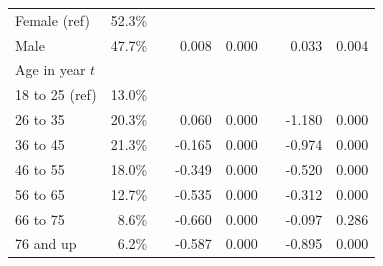 \begin{table}[H]
\begin{tabular}{lrrrrrrr}
		\hspace{2mm} Female (ref)                              & 52.3\%  &  &                          &                       &                      &                          &                       \\
		\hspace{2mm} Male                                      & 47.7\%  &  & 0.008                    & 0.000                 &                      & 0.033                    & 0.004                 \\
		Age in year $t$                             &         &  &                          &                       &                      &                          &                       \\
		\hspace{2mm} 18 to 25 (ref)                            & 13.0\%  &  &                          &                       &                      &                          &                       \\
		\hspace{2mm} 26 to 35                                  & 20.3\%  &  & 0.060                    & 0.000                 &                      & -1.180                   & 0.000                 \\
		\hspace{2mm} 36 to 45                                  & 21.3\%  &  & -0.165                   & 0.000                 &                      & -0.974                   & 0.000                 \\
		\hspace{2mm} 46 to 55                                  & 18.0\%  &  & -0.349                   & 0.000                 &                      & -0.520                   & 0.000                 \\
		\hspace{2mm} 56 to 65                                  & 12.7\%  &  & -0.535                   & 0.000                 &                      & -0.312                   & 0.000                 \\
		\hspace{2mm} 66 to 75                                  & 8.6\%   &  & -0.660                   & 0.000                 &                      & -0.097                   & 0.286                 \\
		\hspace{2mm} 76 and up                                 & 6.2\%   &  & -0.587                   & 0.000                 &                      & -0.895                   & 0.000                 \\

\end{tabular}
\end{table}
